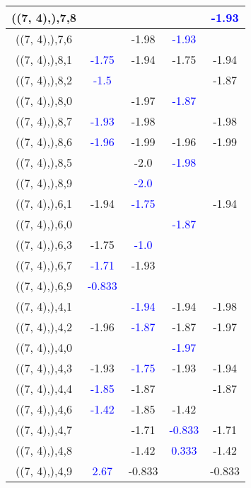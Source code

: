 \documentclass{article}
\begin{document}
\begin{center}
\begin{longtable}{|c|c|c|c|c|}
        	((7, 4),),7,8&&&& \textcolor{blue}{-1.93}\\
        	\hline
        	((7, 4),),7,6&&-1.98& \textcolor{blue}{-1.93}&\\
        	\hline
        	((7, 4),),8,1& \textcolor{blue}{-1.75}&-1.94&-1.75&-1.94\\
        	\hline
        	((7, 4),),8,2& \textcolor{blue}{-1.5}&&&-1.87\\
        	\hline
        	((7, 4),),8,0&&-1.97& \textcolor{blue}{-1.87}&\\
        	\hline
        	((7, 4),),8,7& \textcolor{blue}{-1.93}&-1.98&&-1.98\\
        	\hline
        	((7, 4),),8,6& \textcolor{blue}{-1.96}&-1.99&-1.96&-1.99\\
        	\hline
        	((7, 4),),8,5&&-2.0& \textcolor{blue}{-1.98}&\\
        	\hline
        	((7, 4),),8,9&& \textcolor{blue}{-2.0}&&\\
        	\hline
        	((7, 4),),6,1&-1.94& \textcolor{blue}{-1.75}&&-1.94\\
        	\hline
        	((7, 4),),6,0&&& \textcolor{blue}{-1.87}&\\
        	\hline
        	((7, 4),),6,3&-1.75& \textcolor{blue}{-1.0}&&\\
        	\hline
        	((7, 4),),6,7& \textcolor{blue}{-1.71}&-1.93&&\\
        	\hline
        	((7, 4),),6,9& \textcolor{blue}{-0.833}&&&\\
        	\hline
        	((7, 4),),4,1&& \textcolor{blue}{-1.94}&-1.94&-1.98\\
        	\hline
        	((7, 4),),4,2&-1.96& \textcolor{blue}{-1.87}&-1.87&-1.97\\
        	\hline
        	((7, 4),),4,0&&& \textcolor{blue}{-1.97}&\\
        	\hline
        	((7, 4),),4,3&-1.93& \textcolor{blue}{-1.75}&-1.93&-1.94\\
        	\hline
        	((7, 4),),4,4& \textcolor{blue}{-1.85}&-1.87&&-1.87\\
        	\hline
        	((7, 4),),4,6& \textcolor{blue}{-1.42}&-1.85&-1.42&\\
        	\hline
        	((7, 4),),4,7&&-1.71& \textcolor{blue}{-0.833}&-1.71\\
        	\hline
        	((7, 4),),4,8&&-1.42& \textcolor{blue}{0.333}&-1.42\\
        	\hline
        	((7, 4),),4,9& \textcolor{blue}{2.67}&-0.833&&-0.833\\

\end{longtable}
\end{center}
\end{document}
